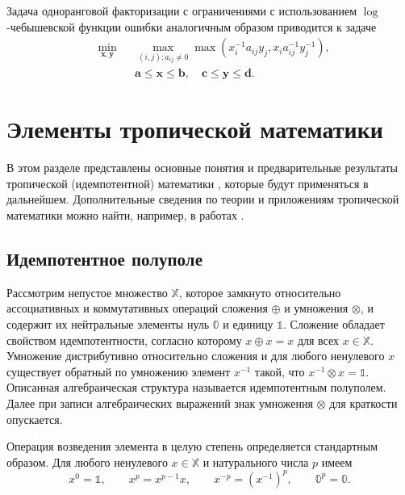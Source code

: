 \documentclass[specialist,
               substylefile = spbu.rtx,
               subf,href,colorlinks=true, 12pt]{disser}
\theoremstyle{definition}
\begin{document}
Задача одноранговой факторизации с ограничениями с использованием $\log$-че\-бы\-шевской функции ошибки  аналогичным образом приводится к задаче 
\begin{equation}\label{eq:minmaxmax}
\begin{aligned}
&
\min_{\bm{x},\bm{y}}
&&
\max_{(i,j):a_{ij}\neq 0}\max(x_{i}^{-1}a_{ij}y_{j},x_{i}a_{ij}^{-1}y_{j}^{-1}),\\
& &&\bm{a}\leq\bm{x}\leq\bm{b},
\quad
\bm{c}\leq\bm{y}\leq\bm{d}.
\end{aligned}
\end{equation}
\section{Элементы тропической математики} 
\label{chap:ETM}

В этом разделе представлены основные понятия и предварительные результаты тропической (идемпотентной) математики \cite{Krivulin2009Methods,Krivulin2014Tropical,Krivulin2015Extremal}, которые будут применяться в дальнейшем. Дополнительные сведения по теории и приложениям тропической математики можно найти, например, в работах \cite{Maslov1994Idempotent,Butkovic2010MaxLinear,McEneaney2006Maxplus}.

\subsection{Идемпотентное полуполе}
Рассмотрим непустое множество $\mathbb{X}$, которое замкнуто относительно ассоциативных и коммутативных операций сложения $\oplus$ и умножения $\otimes$, и содержит их нейтральные элементы нуль $\mathbb{0}$ и единицу $\mathbb{1}$. Сложение обладает свойством идемпотентности, согласно которому $x\oplus x = x$ для всех $x\in\mathbb{X}$. Умножение дистрибутивно относительно сложения и для любого ненулевого $x$ существует обратный по умножению элемент $x^{-1}$ такой, что $x^{-1}\otimes x=\mathbb{1}$. Описанная алгебраическая структура называется идемпотентным полуполем. Далее при записи алгебраических выражений знак умножения $\otimes$ для краткости опускается.

Операция возведения элемента в целую степень определяется стандартным образом.
Для любого ненулевого $x\in\mathbb{X}$ и натурального числа $p$ имеем
\begin{equation*}
x^{0}=\mathbb{1},
\qquad
x^{p}=x^{p-1}x,
\qquad
x^{-p}=(x^{-1})^{p},
\qquad
\mathbb{0}^{p}=\mathbb{0}.
\end{equation*}
\end{document}
